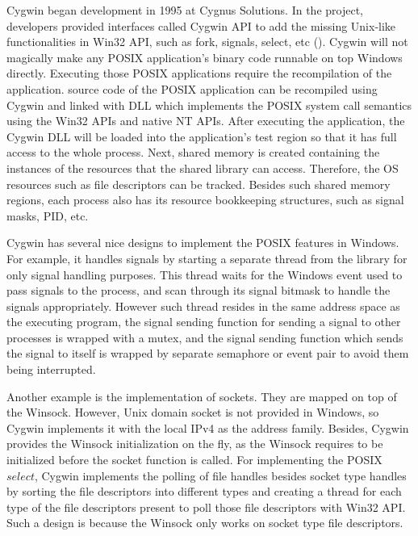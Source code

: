 Cygwin began development in 1995 at Cygnus Solutions. In the project, developers provided interfaces called Cygwin API to add the missing Unix-like functionalities in Win32 API, such as fork, signals, select, etc (\cite{Cygwin}). Cygwin will not magically make any POSIX application's binary code runnable on top  Windows directly. Executing those POSIX applications require the recompilation of the application. source code of the POSIX application can be recompiled using Cygwin and linked with DLL which implements the POSIX system call semantics using the Win32 APIs and native NT APIs. After executing the application, the Cygwin DLL will be loaded into the application's test region so that it has full access to the whole process. Next, shared memory is created containing the instances of the resources that the shared library can access. Therefore, the OS resources such as file descriptors can be tracked. Besides such shared memory regions, each process also has its resource bookkeeping structures, such as signal masks, PID, etc.

Cygwin has several nice designs to implement the POSIX features in Windows. For example, it handles signals by starting a separate thread from the library for only signal handling purposes. This thread waits for the Windows event used to pass signals to the process, and scan through its signal bitmask to handle the signals appropriately. However such thread resides in the same address space as the executing program, the signal sending function for sending a signal to other processes is wrapped with a mutex, and the signal sending function which sends the signal to itself is wrapped by separate semaphore or event pair to avoid them being interrupted. 

Another example is the implementation of sockets. They are mapped on top of the Winsock. However, Unix domain socket is not provided in Windows, so Cygwin implements it with the local IPv4 as the address family. Besides, Cygwin provides the Winsock initialization on the fly, as the Winsock requires to be initialized before the socket function is called. For implementing the POSIX $select$, Cygwin implements the polling of file handles besides socket type handles by sorting the file descriptors into different types and creating a thread for each type of the file descriptors present to poll those file descriptors with Win32 API. Such a design is because the Winsock only works on socket type file descriptors.


